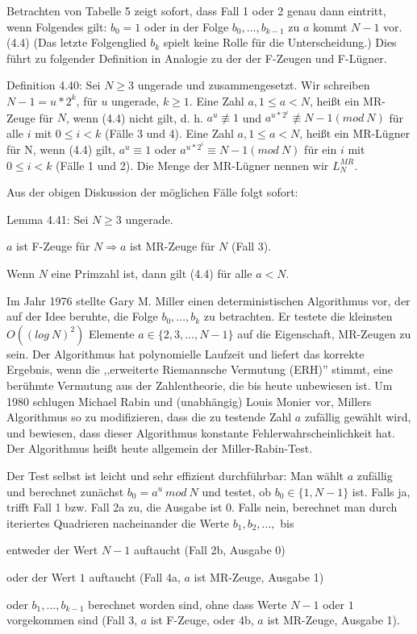 \documentclass[a4paper]{article}
\begin{document}
\begin{multicols}{3}
        Betrachten von Tabelle 5 zeigt sofort, dass Fall 1 oder 2 genau dann eintritt, wenn Folgendes gilt: $b_0=1$ oder in der Folge $b_0,...,b_{k-1}$ zu $a$ kommt $N-1$ vor. (4.4) (Das letzte Folgenglied $b_k$ spielt keine Rolle für die Unterscheidung.) Dies führt zu folgender Definition in Analogie zu der der F-Zeugen und F-Lügner.

        Definition 4.40: Sei $N\geq 3$ ungerade und zusammengesetzt. Wir schreiben $N-1=u*2^k$, für $u$ ungerade, $k\geq 1$. Eine Zahl $a, 1\leq a < N$, heißt ein MR-Zeuge für $N$, wenn (4.4) nicht gilt, d. h. $a^u\not\equiv 1$ und $a^{u*2^i}\not\equiv N-1 (mod\ N)$ für alle $i$ mit $0\leq i < k$ (Fälle 3 und 4). Eine Zahl $a, 1\leq a < N$, heißt ein MR-Lügner für N, wenn (4.4) gilt, $a^u\equiv 1$ oder $a^{u*2^i}\equiv N-1 (mod\ N)$ für ein $i$ mit $0\leq i < k$ (Fälle 1 und 2). Die Menge der MR-Lügner nennen wir $L^{MR}_N$.

        Aus der obigen Diskussion der möglichen Fälle folgt sofort:

        Lemma 4.41: Sei $N\geq 3$ ungerade.
        \begin{enumerate*}
            \item $a$ ist F-Zeuge für $N \Rightarrow a$ ist MR-Zeuge für $N$ (Fall 3).
            \item Wenn $N$ eine Primzahl ist, dann gilt (4.4) für alle $a<N$.
        \end{enumerate*}

        Im Jahr 1976 stellte Gary M. Miller einen deterministischen Algorithmus vor, der auf der Idee beruhte, die Folge $b_0,...,b_k$ zu betrachten. Er testete die kleinsten $O((log\ N)^2)$ Elemente $a\in\{2,3,...,N-1\}$ auf die Eigenschaft, MR-Zeugen zu sein. Der Algorithmus hat polynomielle Laufzeit und liefert das korrekte Ergebnis, wenn die ,,erweiterte Riemannsche Vermutung (ERH)'' stimmt, eine berühmte Vermutung aus der Zahlentheorie, die bis heute unbewiesen ist. Um 1980 schlugen Michael Rabin und (unabhängig) Louis Monier vor, Millers Algorithmus so zu modifizieren, dass die zu testende Zahl $a$ zufällig gewählt wird, und bewiesen, dass dieser Algorithmus konstante Fehlerwahrscheinlichkeit hat. Der Algorithmus heißt heute allgemein der Miller-Rabin-Test.

        Der Test selbst ist leicht und sehr effizient durchführbar: Man wählt $a$ zufällig und berechnet zunächst $b_0=a^u\ mod\ N$ und testet, ob $b_0\in\{1,N-1\}$ ist. Falls ja, trifft Fall 1 bzw. Fall 2a zu, die Ausgabe ist $0$. Falls nein, berechnet man durch iteriertes Quadrieren nacheinander die Werte $b_1,b_2,...,$ bis
        \begin{itemize*}
            \item entweder der Wert $N-1$ auftaucht (Fall 2b, Ausgabe 0)
            \item oder der Wert $1$ auftaucht (Fall 4a, $a$ ist MR-Zeuge, Ausgabe 1)
            \item oder $b_1,...,b_{k-1}$ berechnet worden sind, ohne dass Werte $N-1$ oder $1$ vorgekommen sind (Fall 3, $a$ ist F-Zeuge, oder 4b, $a$ ist MR-Zeuge, Ausgabe 1).
        \end{itemize*}


\end{multicols}
\end{document}
